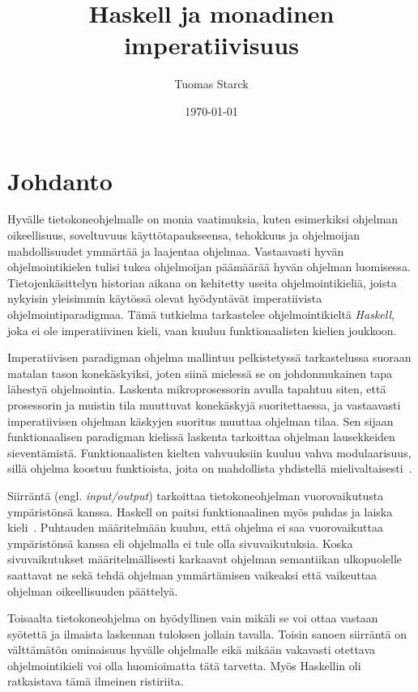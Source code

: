 \documentclass[finnish]{tktltiki2}
\title{Haskell ja monadinen imperatiivisuus}
\author{Tuomas Starck}
\date{\today}
\begin{document}
\frontmatter

\maketitle
\makeabstract

\tableofcontents

\mainmatter

\newcommand{\arr}[0]{\rightarrow}
\newcommand{\code}[1]{\texttt{#1}}


\section{Johdanto}

Hyvälle tietokoneohjelmalle on monia vaatimuksia, kuten esimerkiksi ohjelman oikeellisuus,
soveltuvuus käyttötapaukseensa, tehokkuus ja ohjelmoijan mahdollisuudet ymmärtää ja laajentaa
ohjelmaa. Vastaavasti hyvän ohjelmointikielen tulisi tukea ohjelmoijan päämäärää hyvän ohjelman
luomisessa. Tietojenkäsittelyn historian aikana on kehitetty useita ohjelmointikieliä, joista
nykyisin yleisimmin käytössä olevat hyödyntävät imperatiivista ohjelmointiparadigmaa. Tämä tutkielma
tarkastelee ohjelmointikieltä \emph{Haskell}, joka ei ole imperatiivinen kieli, vaan kuuluu
funktionaalisten kielien joukkoon.

Imperatiivisen paradigman ohjelma mallintuu pelkistetyssä tarkastelussa suoraan matalan tason
konekäskyiksi, joten siinä mielessä se on johdonmukainen tapa lähestyä ohjelmointia. Laskenta
mikroprosessorin avulla tapahtuu siten, että prosessorin ja muistin tila muuttuvat konekäskyjä
suoritettaessa, ja vastaavasti imperatiivisen ohjelman käskyjen suoritus muuttaa ohjelman tilaa. Sen
sijaan funktionaalisen paradigman kielissä laskenta tarkoittaa ohjelman lausekkeiden sieventämistä.
Funktionaalisten kielten vahvuuksiin kuuluu vahva modulaarisuus, sillä ohjelma koostuu funktioista,
joita on mahdollista yhdistellä mielivaltaisesti~\cite{why90}.

Siirräntä (engl. \emph{input/output}) tarkoittaa tietokoneohjelman vuorovaikutusta ympäristönsä
kanssa. Haskell on paitsi funktionaalinen myös puhdas ja laiska kieli~\cite{rep92}. Puhtauden
määritelmään kuuluu, että ohjelma ei saa vuorovaikuttaa ympäristönsä kanssa eli ohjelmalla ei tule
olla sivuvaikutuksia. Koska sivuvaikutukset määritelmällisesti karkaavat ohjelman semantiikan
ulkopuolelle saattavat ne sekä tehdä ohjelman ymmärtämisen vaikeaksi että vaikeuttaa ohjelman
oikeellisuuden päättelyä.

Toisaalta tietokoneohjelma on hyödyllinen vain mikäli se voi ottaa vastaan syötettä ja ilmaista
laskennan tuloksen jollain tavalla. Toisin sanoen siirräntä on välttämätön ominaisuus hyvälle
ohjelmalle eikä mikään vakavasti otettava ohjelmointikieli voi olla huomioimatta tätä tarvetta. Myös
Haskellin oli ratkaistava tämä ilmeinen ristiriita.
\end{document}
